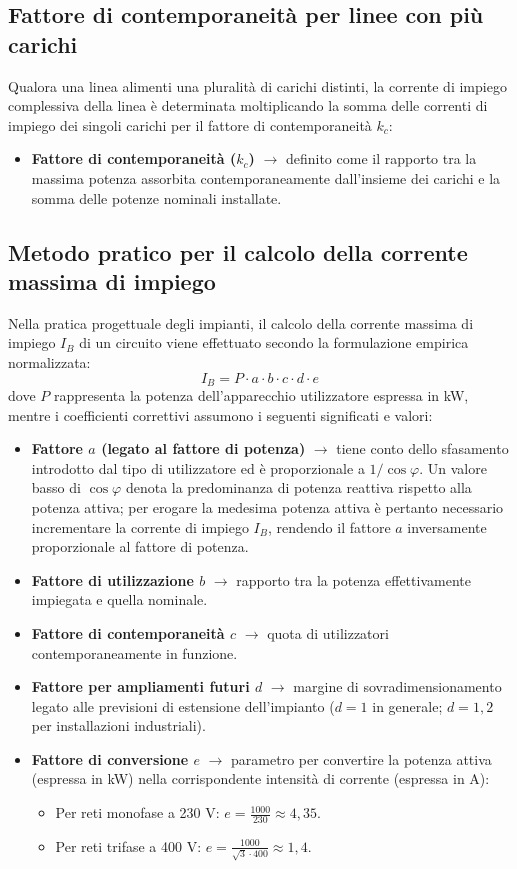 \subsection{Fattore di contemporaneità per linee con più carichi}
Qualora una linea alimenti una pluralità di carichi distinti, la corrente di impiego complessiva della linea è determinata moltiplicando la somma delle correnti di impiego dei singoli carichi per il fattore di contemporaneità $k_c$:
\begin{itemize}
    \item \textbf{Fattore di contemporaneità ($k_c$)} $\rightarrow$ definito come il rapporto tra la massima potenza assorbita contemporaneamente dall'insieme dei carichi e la somma delle potenze nominali installate.
\end{itemize}

\subsection{Metodo pratico per il calcolo della corrente massima di impiego}
Nella pratica progettuale degli impianti, il calcolo della corrente massima di impiego $I_B$ di un circuito viene effettuato secondo la formulazione empirica normalizzata:
\[ I_B = P \cdot a \cdot b \cdot c \cdot d \cdot e \]
dove $P$ rappresenta la potenza dell'apparecchio utilizzatore espressa in kW, mentre i coefficienti correttivi assumono i seguenti significati e valori:
\begin{itemize}
    \item \textbf{Fattore $a$ (legato al fattore di potenza)} $\rightarrow$ tiene conto dello sfasamento introdotto dal tipo di utilizzatore ed è proporzionale a $1/\cos\varphi$. Un valore basso di $\cos\varphi$ denota la predominanza di potenza reattiva rispetto alla potenza attiva; per erogare la medesima potenza attiva è pertanto necessario incrementare la corrente di impiego $I_B$, rendendo il fattore $a$ inversamente proporzionale al fattore di potenza.
    \item \textbf{Fattore di utilizzazione $b$} $\rightarrow$ rapporto tra la potenza effettivamente impiegata e quella nominale.
    \item \textbf{Fattore di contemporaneità $c$} $\rightarrow$ quota di utilizzatori contemporaneamente in funzione.
    \item \textbf{Fattore per ampliamenti futuri $d$} $\rightarrow$ margine di sovradimensionamento legato alle previsioni di estensione dell'impianto ($d = 1$ in generale; $d = 1{,}2$ per installazioni industriali).
    \item \textbf{Fattore di conversione $e$} $\rightarrow$ parametro per convertire la potenza attiva (espressa in kW) nella corrispondente intensità di corrente (espressa in A):
    \begin{itemize}
        \item Per reti monofase a 230 V: $e = \frac{1000}{230} \approx 4{,}35$.
        \item Per reti trifase a 400 V: $e = \frac{1000}{\sqrt{3} \cdot 400} \approx 1{,}4$.
    \end{itemize}
\end{itemize}

